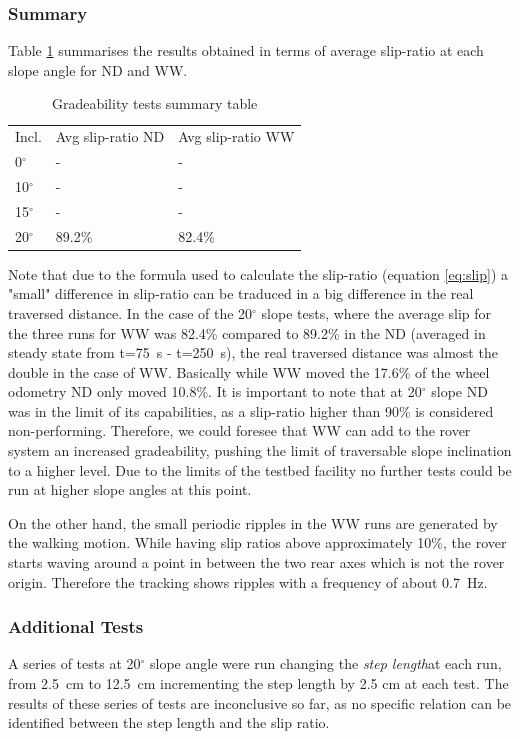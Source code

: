 \documentclass[a4paper,twocolumn]{esapub2005} %
\begin{document}
\subsubsection*{Summary}
Table \ref{tab:SlopeSummaryTable} summarises the results obtained in terms of average slip-ratio at each slope angle for ND and WW.

\begin{table}[h]
	\begin{tabular}{lll}
	Incl.             & Avg slip-ratio ND & Avg slip-ratio WW \\
	0$^{\circ}$       & -                 & -                 \\
	10$^{\circ}$      & -                 & -                 \\
	15$^{\circ}$      & -                 & -                 \\
	20$^{\circ}$      & 89.2\%            & 82.4\%                
	\end{tabular}
	\caption{Gradeability tests summary table}
	\label{tab:SlopeSummaryTable}
\end{table}

Note that due to the formula used to calculate the slip-ratio (equation \ref{eq:slip}) a "small" difference in slip-ratio can be traduced in a big difference in the real traversed distance. In the case of the 20$^{\circ}$ slope tests, where the average slip for the three runs for WW was 82.4\% compared to 89.2\% in the ND (averaged in steady state from t=75~\unit{s} - t=250~\unit{s}), the real traversed distance was almost the double in the case of WW. Basically while WW moved the 17.6\% of the wheel odometry ND only moved 10.8\%. It is important to note that at 20$^{\circ}$ slope ND was in the limit of its capabilities, as a slip-ratio higher than 90\% is considered non-performing. Therefore, we could foresee that WW can add to the rover system an increased gradeability, pushing the limit of traversable slope inclination to a higher level. Due to the limits of the testbed facility no further tests could be run at higher slope angles at this point.

On the other hand, the small periodic ripples in the WW
runs are generated by the walking motion. While having slip ratios above
approximately 10\%, the rover starts waving around a point in between the two
rear axes which is not the rover origin. Therefore the tracking shows ripples
with a frequency of about 0.7~\unit{Hz}.


\subsubsection*{Additional Tests}
A series of tests at 20$^{\circ}$ slope angle were run changing the \textit{step length}\footnotemark[3]
at each run, from 2.5~\unit{cm} to 12.5~\unit{cm} incrementing the step length by 2.5 cm at
each test. The results of these series of tests are inconclusive so far, as no
specific relation can be identified between the step length and the slip ratio.
\end{document}
